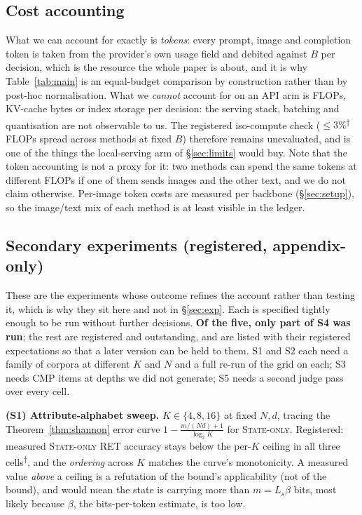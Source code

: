 \documentclass[10pt]{article}
\theoremstyle{definition}
\theoremstyle{plain}
\newcommand{\pred}{\textsuperscript{\textcolor{cpred}{$\dagger$}}}
\begin{document}
\subsection{Cost accounting}
What we can account for exactly is \emph{tokens}: every prompt, image and completion token is taken from the provider's own usage field and debited against $B$ per decision, which is the resource the whole paper is about, and it is why Table~\ref{tab:main} is an equal-budget comparison by construction rather than by post-hoc normalisation. What we \emph{cannot} account for on an API arm is FLOPs, KV-cache bytes or index storage per decision: the serving stack, batching and quantisation are not observable to us. The registered iso-compute check ($\le3\%$\pred{} FLOPs spread across methods at fixed $B$) therefore remains unevaluated, and is one of the things the local-serving arm of \S\ref{sec:limits} would buy. Note that the token accounting is not a proxy for it: two methods can spend the same tokens at different FLOPs if one of them sends images and the other text, and we do not claim otherwise. Per-image token costs are measured per backbone (\S\ref{sec:setup}), so the image/text mix of each method is at least visible in the ledger.

\subsection{Secondary experiments (registered, appendix-only)}
These are the experiments whose outcome refines the account rather than testing it, which is why they sit here and not in \S\ref{sec:exp}. Each is specified tightly enough to be run without further decisions. \textbf{Of the five, only part of S4 was run}; the rest are registered and outstanding, and are listed with their registered expectations so that a later version can be held to them. S1 and S2 each need a family of corpora at different $K$ and $N$ and a full re-run of the grid on each; S3 needs CMP items at depths we did not generate; S5 needs a second judge pass over every cell.

\textbf{(S1) Attribute-alphabet sweep.} $K\in\{4,8,16\}$ at fixed $N,d$, tracing the Theorem~\ref{thm:shannon} error curve $1-\frac{m/(Nd)+1}{\log_2K}$ for \textsc{State-only}. Registered: measured \textsc{State-only} RET accuracy stays below the per-$K$ ceiling in all three cells\pred{}, and the \emph{ordering} across $K$ matches the curve's monotonicity. A measured value \emph{above} a ceiling is a refutation of the bound's applicability (not of the bound), and would mean the state is carrying more than $m=L_s\beta$ bits, most likely because $\beta$, the bits-per-token estimate, is too low.
\end{document}
